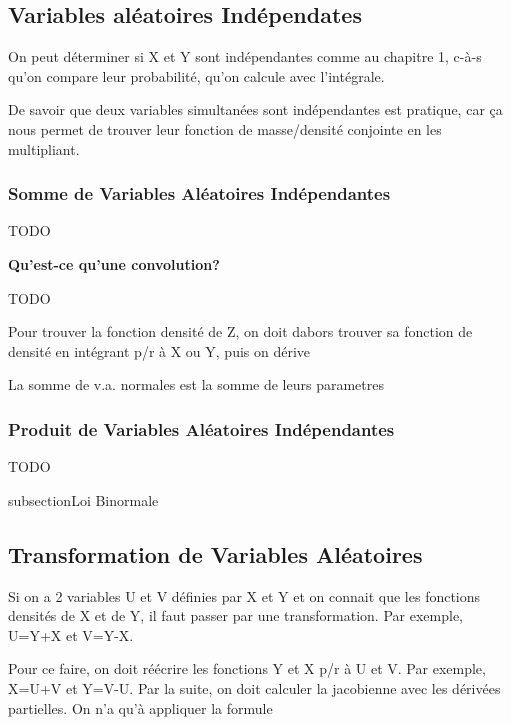 \documentclass{article}
\begin{document}
\subsection{Variables aléatoires Indépendates}

On peut déterminer si X et Y sont indépendantes comme au chapitre 1, c-à-s
qu'on compare leur probabilité, qu'on calcule avec l'intégrale.

De savoir que deux variables simultanées sont indépendantes est pratique,
car ça nous permet de trouver leur fonction de masse/densité conjointe
en les multipliant.

\subsubsection{Somme de Variables Aléatoires Indépendantes}

TODO

\textbf{Qu'est-ce qu'une convolution?}

TODO


\begin{problem}[Trouver la fonction densité de Z=X+Y]
    Pour trouver la fonction densité de Z, on doit dabors trouver sa
    fonction de densité en intégrant p/r à X ou Y, puis on dérive
\end{problem}

\begin{proposition}
    La somme de v.a. normales est la somme de leurs parametres
\end{proposition}

\subsubsection{Produit de Variables Aléatoires Indépendantes}%
\label{ssub:Produit de Variables Aléatoires Indépendantes}

TODO

subsection{Loi Binormale}

\subsection{Transformation de Variables Aléatoires}

Si on a 2 variables U et V définies par X et Y et on connait que les
fonctions densités de X et de Y, il faut passer par une transformation.
Par exemple, U=Y+X et V=Y-X.

Pour ce faire, on doit réécrire les fonctions Y et X p/r à U et V. Par
exemple, X=U+V et Y=V-U. Par la suite, on doit calculer la jacobienne
avec les dérivées partielles. On n'a qu'à appliquer la formule
\end{document}
